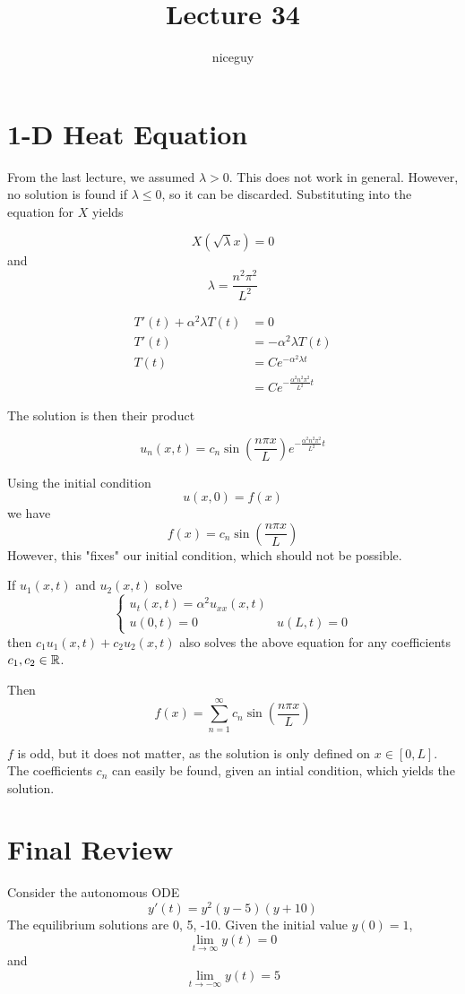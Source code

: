 \documentclass[12pt]{article}
\author{niceguy}
\title{Lecture 34}
\begin{document}
\maketitle

\section{1-D Heat Equation}

From the last lecture, we assumed $\lambda > 0$. This does not work in general. However, no solution is found if $\lambda \leq 0$, so it can be discarded. Substituting into the equation for $X$ yields

$$X(\sqrt{\lambda}x) = 0$$
and
$$\lambda = \frac{n^2\pi^2}{L^2}$$

\begin{align*}
	T'(t) + \alpha^2\lambda T(t) &= 0 \\
	T'(t) &= -\alpha^2\lambda T(t) \\
	T(t) &= Ce^{-\alpha^2\lambda t} \\
	     &= Ce^{-\frac{\alpha^2n^2\pi^2}{L^2}t}
\end{align*}

The solution is then their product

$$u_n(x,t) = c_n\sin\left(\frac{n\pi x}{L}\right)e^{-\frac{\alpha^2n^2\pi^2}{L^2}t}$$

Using the initial condition
$$u(x,0) = f(x)$$
we have
$$f(x) = c_n\sin\left(\frac{n\pi x}{L}\right)$$
However, this "fixes" our initial condition, which should not be possible.

\begin{thm}
	If $u_1(x,t)$ and $u_2(x,t)$ solve
	$$\begin{cases} u_t(x,t)=\alpha^2u_{xx}(x,t) & \\ u(0,t)=0 & u(L,t)=0\end{cases}$$
		then $c_1u_1(x,t) + c_2u_2(x,t)$ also solves the above equation for any coefficients $c_1,c_2\in\mathbb{R}$.
\end{thm}

Then
$$f(x) = \sum_{n=1}^\infty c_n\sin\left(\frac{n\pi x}{L}\right)$$

$f$ is odd, but it does not matter, as the solution is only defined on $x\in[0,L]$. The coefficients $c_n$ can easily be found, given an intial condition, which yields the solution.

\section{Final Review}

Consider the autonomous ODE
$$y'(t) = y^2(y-5)(y+10)$$
The equilibrium solutions are 0, 5, -10. Given the initial value $y(0)=1$,
$$\lim_{t\rightarrow\infty}y(t) = 0$$
and
$$\lim_{t\rightarrow -\infty}y(t) = 5$$
\end{document}
